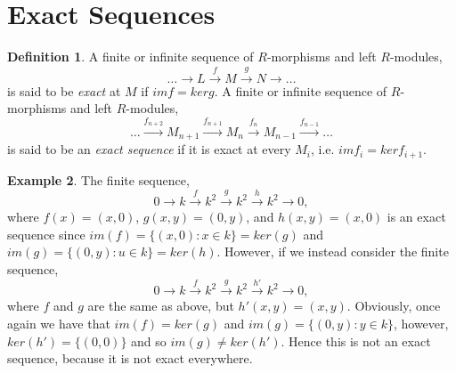 \documentclass[11.5pt, twoside, a4paper, titlepage]{report}
\theoremstyle{definition}
\newtheorem{mydef}{Definition}[section]
\newtheorem{eg}[mydef]{Example}
\theoremstyle{plain}
\begin{document}

\section{Exact Sequences}

\begin{mydef}
A finite or infinite sequence of $R$-morphisms and left $R$-modules,
\begin{equation*}
\dots \xrightarrow{} L \xrightarrow{f}M \xrightarrow{g} N \xrightarrow{} \dots
\end{equation*}
is said to be \emph{exact} at $M$ if $imf=kerg$. A finite or infinite sequence of $R$-morphisms and left $R$-modules,
\begin{equation*}
\dots \xrightarrow{f_{n+2}} M_{n+1} \xrightarrow{f_{n+1}} M_n \xrightarrow{f_n} M_{n-1} \xrightarrow{f_{n-1}} \dots
\end{equation*}
is said to be an \emph{exact sequence} if it is exact at every $M_i$, i.e. $imf_i=kerf_{i+1}$. 
\end{mydef}

\begin{eg}
The finite sequence,
\begin{equation*}
0\xrightarrow{}k\xrightarrow{f}k^2\xrightarrow{g}k^2\xrightarrow{h}k^2\xrightarrow{}0,
\end{equation*}
where $f(x)=(x,0)$, $g(x, y)=(0,y)$, and $h(x,y)=(x,0)$ is an exact sequence since $im(f)=\{(x,0):x\in k\}=ker(g)$ and $im(g)=\{(0,y):u\in k\}=ker(h)$. 
However, if we instead consider the finite sequence, 
\begin{equation*}
0\xrightarrow{}k\xrightarrow{f}k^2\xrightarrow{g}k^2\xrightarrow{h'}k^2\xrightarrow{}0,
\end{equation*}
where $f$ and $g$ are the same as above, but $h'(x,y)=(x,y)$. Obviously, once again we have that $im(f)=ker(g)$ and $im(g)=\{(0,y):y\in k\}$, however, $ker(h')=\{(0,0)\}$ and so $im(g)\neq ker(h')$. Hence this is not an exact sequence, because it is not exact everywhere.
\end{eg}
\end{document}
